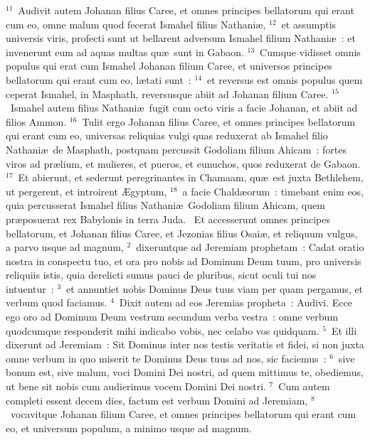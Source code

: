 ${}^{11}$~Audivit autem Johanan filius Caree, et omnes principes bellatorum qui erant cum eo, omne malum quod fecerat Ismahel filius Nathani\ae ,
${}^{12}$~et assumptis universis viris, profecti sunt ut bellarent adversum Ismahel filium Nathani\ae~: et invenerunt eum ad aquas multas qu\ae\ sunt in Gabaon.
${}^{13}$~Cumque vidisset omnis populus qui erat cum Ismahel Johanan filium Caree, et universos principes bellatorum qui erant cum eo, l\ae tati sunt~:
${}^{14}$~et reversus est omnis populus quem ceperat Ismahel, in Masphath, reversusque abiit ad Johanan filium Caree.
${}^{15}$~Ismahel autem filius Nathani\ae\ fugit cum octo viris a facie Johanan, et abiit ad filios Ammon.
${}^{16}$~Tulit ergo Johanan filius Caree, et omnes principes bellatorum qui erant cum eo, universas reliquias vulgi quas reduxerat ab Ismahel filio Nathani\ae\ de Masphath, postquam percussit Godoliam filium Ahicam~: fortes viros ad pr\ae lium, et mulieres, et pueros, et eunuchos, quos reduxerat de Gabaon.
${}^{17}$~Et abierunt, et sederunt peregrinantes in Chamaam, qu\ae\ est juxta Bethlehem, ut pergerent, et introirent \AE gyptum,
${}^{18}$~a facie Chald\ae orum~: timebant enim eos, quia percusserat Ismahel filius Nathani\ae\ Godoliam filium Ahicam, quem pr\ae posuerat rex Babylonis in terra Juda.
~\lettrine[lines=10,image=true,loversize=0.05,lraise=-0.03]{E}{}t accesserunt omnes principes bellatorum, et Johanan filius Caree, et Jezonias filius Osai\ae , et reliquum vulgus, a parvo usque ad magnum,
${}^{2}$~dixeruntque ad Jeremiam prophetam~: Cadat oratio nostra in conspectu tuo, et ora pro nobis ad Dominum Deum tuum, pro universis reliquiis istis, quia derelicti sumus pauci de pluribus, sicut oculi tui nos intuentur~:
${}^{3}$~et annuntiet nobis Dominus Deus tuus viam per quam pergamus, et verbum quod faciamus.
${}^{4}$~Dixit autem ad eos Jeremias propheta~: Audivi. Ecce ego oro ad Dominum Deum vestrum secundum verba vestra~: omne verbum quodcumque responderit mihi indicabo vobis, nec celabo vos quidquam.
${}^{5}$~Et illi dixerunt ad Jeremiam~: Sit Dominus inter nos testis veritatis et fidei, si non juxta omne verbum in quo miserit te Dominus Deus tuus ad nos, sic faciemus~:
${}^{6}$~sive bonum est, sive malum, voci Domini Dei nostri, ad quem mittimus te, obediemus, ut bene sit nobis cum audierimus vocem Domini Dei nostri.
${}^{7}$~Cum autem completi essent decem dies, factum est verbum Domini ad Jeremiam,
${}^{8}$~vocavitque Johanan filium Caree, et omnes principes bellatorum qui erant cum eo, et universum populum, a minimo usque ad magnum.
